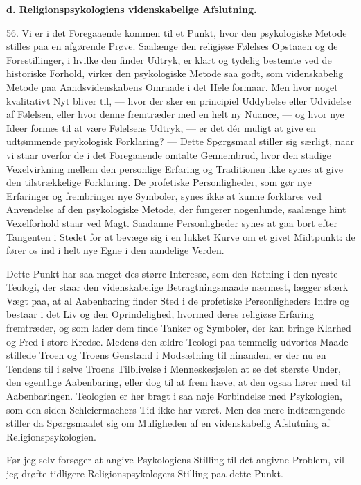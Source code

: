 \documentclass[12pt,a4paper,openany]{book}
\newcommand{\opage}[1]{\marginnote{\footnotesize\textit{[#1]}}}
\begin{document}
\begin{center}\textbf{d. Religionspsykologiens videnskabelige Afslutning.}\end{center}

56. Vi er i det Foregaaende kommen til et Punkt, hvor den psykologiske
Metode stilles paa en afgørende Prøve. Saalænge den religiøse Følelses
Opstaaen og de Forestillinger, i hvilke den finder Udtryk, er klart og
tydelig bestemte ved de historiske Forhold, virker den psykologiske
Metode saa godt, som videnskabelig Metode paa Aandsvidenskabens Omraade
i det Hele formaar. Men hvor noget kvalitativt Nyt bliver til, --- hvor
der sker en principiel Uddybelse eller Udvidelse af Følelsen, eller hvor
denne fremtræder med en helt ny Nuance, --- og hvor nye Ideer formes til
at være Følelsens Udtryk, --- er det dér muligt at give en udtømmende
psykologisk Forklaring? --- Dette Spørgsmaal stiller sig særligt, naar
vi staar overfor de i det Foregaaende omtalte Gennembrud, hvor den
stadige Vexelvirkning mellem den personlige Erfaring og Traditionen ikke
synes at give den tilstrækkelige Forklaring. De profetiske
Personligheder, som gør nye Erfaringer og frembringer nye Symboler,
synes ikke at kunne forklares ved Anvendelse af den psykologiske Metode,
der fungerer nogenlunde, saalænge hint Vexelforhold staar ved Magt.
Saadanne Personligheder synes at gaa bort efter Tangenten i Stedet for
at bevæge sig i en lukket Kurve om et givet Midtpunkt: de fører os ind i
helt nye Egne i den aandelige Verden.

Dette Punkt har saa meget des større Interesse, som den Retning i den
nyeste Teologi, der staar den videnskabelige Betragtningsmaade nærmest,
lægger stærk Vægt paa, at al Aabenbaring finder Sted i de profetiske
Personligheders Indre og bestaar i det Liv og den Oprindelighed, hvormed
deres religiøse Erfaring fremtræder, og som lader dem finde Tanker og
Symboler, der kan bringe Klarhed og Fred i store Kredse. Medens den
ældre Teologi paa temmelig udvortes Maade stillede Troen og Troens
Genstand i Modsætning til hinanden, er der nu en Tendens til i selve
Troens Tilblivelse i Menneskesjælen at se det største Under, den
egentlige Aabenbaring, eller dog til at frem%
\opage{127}hæve, at den ogsaa hører med til Aabenbaringen. Teologien er
her bragt i saa nøje Forbindelse med Psykologien, som den siden
Schleiermachers Tid ikke har været. Men des mere indtrængende stiller da
Spørgsmaalet sig om Muligheden af en videnskabelig Afslutning af
Religionspsykologien.

Før jeg selv forsøger at angive Psykologiens Stilling til det angivne
Problem, vil jeg drøfte tidligere Religionspsykologers Stilling paa
dette Punkt.
\end{document}
